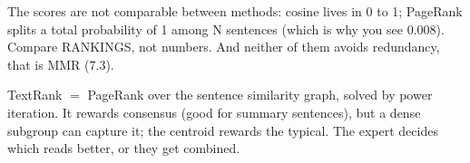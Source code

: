 \documentclass[11pt,a4paper]{article}
\begin{document}
\begin{ojo}
The scores are not comparable between methods: cosine lives in 0 to 1; PageRank splits a total
probability of 1 among N sentences (which is why you see 0.008). Compare RANKINGS, not numbers.
And neither of them avoids redundancy, that is MMR (7.3).
\end{ojo}

\begin{resumen}
TextRank $=$ PageRank over the sentence similarity graph, solved by power iteration. It rewards
consensus (good for summary sentences), but a dense subgroup can capture it; the centroid
rewards the typical. The expert decides which reads better, or they get combined.
\end{resumen}
\end{document}
